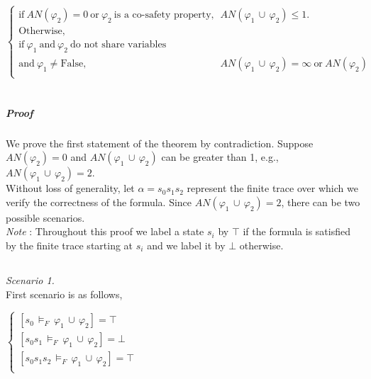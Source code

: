 \begin{theorem}

$ 
 \left. 
\begin{cases} 
 \text{if} ~ AN(\varphi_2) = 0 ~  \text{or} ~ \varphi_2 ~ \text{is a co-safety property,} & AN(\varphi_1 \, \cup \, \varphi_2) \leq 1. \\ 
 \text{Otherwise,} \\
\text{if} ~ \varphi_1~  \text{and}~ \varphi_2 ~ \text{do not share variables} \\
 \text{and} ~ \varphi_1 \neq \text{False,}  & AN(\varphi_1 \, \cup \, \varphi_2) = \infty~ \text{or}~ AN(\varphi_2)\\
\end{cases}\right. $  \\  \\
  

\end{theorem}



\subparagraph{Proof}


We prove the first statement of the theorem by contradiction. Suppose $AN(\varphi_2) = 0$ and $AN(\varphi_1 \, \cup \, \varphi_2)$ can be greater than 1, e.g., $AN(\varphi_1 \, \cup \, \varphi_2) = 2$. \\ 
Without loss of generality, let $\alpha = s_0 s_1 s_2$ represent the finite trace over which we verify the correctness of the formula. Since $AN(\varphi_1 \, \cup \, \varphi_2) = 2$, there can be two possible scenarios.\\
\textit{Note} : Throughout this proof we label a state $s_i$ by $\top$ if the formula is satisfied by the finite trace starting at $s_i$ and we label it by $\bot$ otherwise. 

\subsection*{}

\textit{Scenario 1.} \\

First scenario is as follows, 
~~~
 \begin{center}
 $
  \left.
  \begin{cases}
    [s_0 \, \models_F \, \varphi_1 \, \cup \, \varphi_2] = \top \\
    [s_0 s_1 \, \models_F \, \varphi_1 \, \cup \, \varphi_2] = \bot \\
     [s_0 s_1 s_2\, \models_F \, \varphi_1 \, \cup \, \varphi_2] = \top \\
  \end{cases}
  \right.
$
\end{center}

